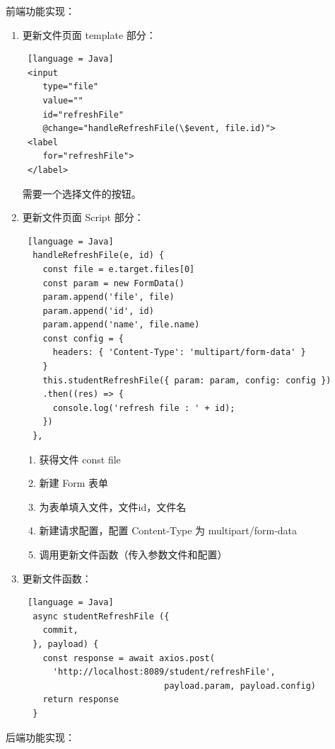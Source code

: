 前端功能实现：
\begin{enumerate}
  \item 更新文件页面 template 部分：
        \begin{lstlisting} [language = Java]
 <input 
    type="file" 
    value="" 
    id="refreshFile" 
    @change="handleRefreshFile(\$event, file.id)">
 <label 
    for="refreshFile">
 </label>
    \end{lstlisting}
        需要一个选择文件的按钮。
  \item 更新文件页面 Script 部分：
        \begin{lstlisting} [language = Java]
  handleRefreshFile(e, id) {
    const file = e.target.files[0]
    const param = new FormData()
    param.append('file', file)
    param.append('id', id)
    param.append('name', file.name)
    const config = {
      headers: { 'Content-Type': 'multipart/form-data' }
    }
    this.studentRefreshFile({ param: param, config: config })
    .then((res) => {
      console.log('refresh file : ' + id);
    })
  },
    \end{lstlisting}
        \begin{enumerate}
          \item 获得文件 const file
          \item 新建 Form 表单
          \item 为表单填入文件，文件id，文件名
          \item 新建请求配置，配置 Content-Type 为 multipart/form-data
          \item 调用更新文件函数（传入参数文件和配置）
        \end{enumerate}
  \item 更新文件函数：
        \begin{lstlisting} [language = Java]
  async studentRefreshFile ({
    commit,
  }, payload) {
    const response = await axios.post(
      'http://localhost:8089/student/refreshFile', 
                            payload.param, payload.config)
    return response
  }
    \end{lstlisting}
\end{enumerate}
后端功能实现：
